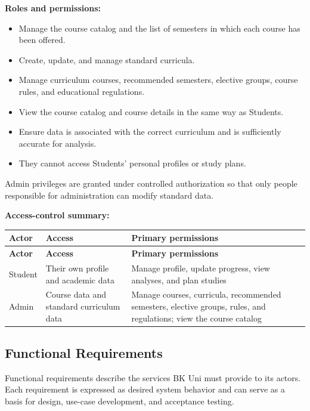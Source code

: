 \textbf{Roles and permissions:}
\begin{itemize}
    \item Manage the course catalog and the list of semesters in which each course has been offered.
    \item Create, update, and manage standard curricula.
    \item Manage curriculum courses, recommended semesters, elective groups, course rules, and educational regulations.
    \item View the course catalog and course details in the same way as Students.
    \item Ensure data is associated with the correct curriculum and is sufficiently accurate for analysis.
    \item They cannot access Students' personal profiles or study plans.
\end{itemize}

Admin privileges are granted under controlled authorization so that only people responsible for administration can modify standard data.

\textbf{Access-control summary:}
\begin{longtable}{|p{}|p{}|p{}|}
\hline
\textbf{Actor} & \textbf{Access} & \textbf{Primary permissions} \\
\hline
\endfirsthead
\hline
\textbf{Actor} & \textbf{Access} & \textbf{Primary permissions} \\
\hline
\endhead
Student & Their own profile and academic data & Manage profile, update progress, view analyses, and plan studies \\
\hline
Admin & Course data and standard curriculum data & Manage courses, curricula, recommended semesters, elective groups, rules, and regulations; view the course catalog \\
\hline
\end{longtable}

\subsection{Functional Requirements}

Functional requirements describe the services BK Uni must provide to its actors. Each requirement is expressed as desired system behavior and can serve as a basis for design, use-case development, and acceptance testing.

